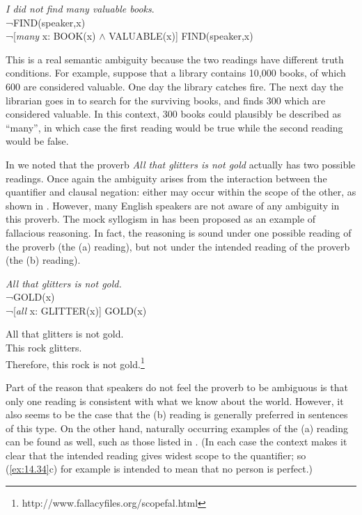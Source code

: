 \ea \label{ex:14.31}
\textit{I did not find many valuable books}.\\
 ¬FIND(speaker,x)\\
\ex  ¬[\textit{many} x: BOOK(x) $\wedge$ VALUABLE(x)] FIND(speaker,x)
                       \z
\z


This is a real semantic ambiguity because the two readings have different truth conditions. For example, suppose that a library contains 10,000 books, of which 600 are considered valuable. One day the library catches fire. The next day the librarian goes in to search for the surviving books, and finds 300 which are considered valuable. In this context, 300 books could plausibly be described as “many”, in which case the first reading would be true while the second reading would be false.



In  we noted that the proverb \textit{All that glitters is not gold} actually has two possible readings. Once again the ambiguity arises from the interaction between the quantifier and clausal negation: either may occur within the scope of the other, as shown in . However, many English speakers are not aware of any ambiguity in this proverb. The mock syllogism in  has been proposed as an example of fallacious reasoning. In fact, the reasoning is sound under one possible reading of the proverb (the (a) reading), but not under the intended reading of the proverb (the (b) reading).


\ea \label{ex:14.32}
\textit{All that glitters is not gold.}\\
 ¬GOLD(x)\\
\ex  ¬[\textit{all} x: GLITTER(x)] GOLD(x)
                       \z
\z

\ea \label{ex:14.33}
All that glitters is not gold.\\
This rock glitters.\\
Therefore, this rock is not gold.\footnote{http://www.fallacyfiles.org/scopefal.html}
\z


Part of the reason that speakers do not feel the proverb to be ambiguous is that only one reading is consistent with what we know about the world. However, it also seems to be the case that the (b) reading is generally preferred in sentences of this type. On the other hand, naturally occurring examples of the (a) reading can be found as well, such as those listed in . (In each case the context makes it clear that the intended reading gives widest scope to the quantifier; so (\ref{ex:14.34}c) for example is intended to mean that no person is perfect.)


